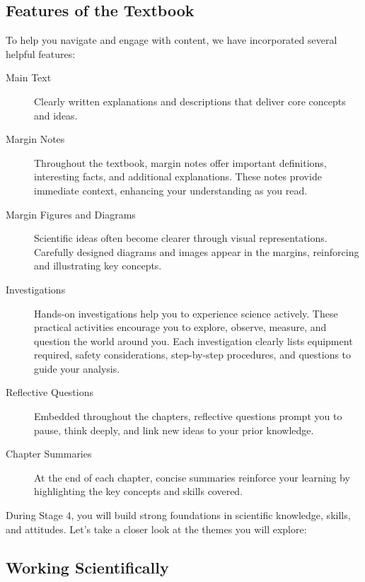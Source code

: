 \subsection{Features of the Textbook}

To help you navigate and engage with content, we have incorporated several helpful features:

\begin{description}

\item[Main Text] Clearly written explanations and descriptions that deliver core concepts and ideas.

\item[Margin Notes] Throughout the textbook, margin notes offer important definitions, interesting facts, and additional explanations. These notes provide immediate context, enhancing your understanding as you read.

\item[Margin Figures and Diagrams] Scientific ideas often become clearer through visual representations. Carefully designed diagrams and images appear in the margins, reinforcing and illustrating key concepts.

\item[Investigations] Hands-on investigations help you to experience science actively. These practical activities encourage you to explore, observe, measure, and question the world around you. Each investigation clearly lists equipment required, safety considerations, step-by-step procedures, and questions to guide your analysis.

\item[Reflective Questions] Embedded throughout the chapters, reflective questions prompt you to pause, think deeply, and link new ideas to your prior knowledge.

\item[Chapter Summaries] At the end of each chapter, concise summaries reinforce your learning by highlighting the key concepts and skills covered.

\end{description}

\FloatBarrier

\FloatBarrier

During Stage 4, you will build strong foundations in scientific knowledge, skills, and attitudes. Let's take a closer look at the themes you will explore:

\subsection{Working Scientifically}


